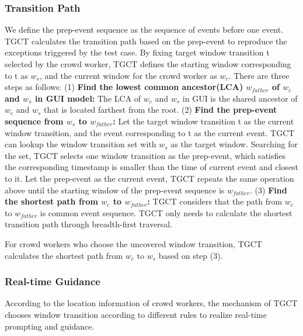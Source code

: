 \subsubsection{Transition Path}
We define the prep-event sequence as the sequence of events before one event. TGCT calculates the transition path based on the prep-event to reproduce the exceptions triggered by the test case. By fixing target window transition t selected by the crowd worker, TGCT defines the starting window corresponding to t as $w_{s}$, and the current window for the crowd worker as $w_{c}$.
There are three steps as follows:
(1) \textbf{Find the lowest common ancestor(LCA) $w_{father}$ of $w_{c}$ and $w_{s}$ in GUI model:} The LCA of $w_{c}$ and $w_{s}$ in GUI is the shared ancestor of $w_{c}$ and $w_{s}$ that is located farthest from the root.
(2) \textbf{Find the prep-event sequence from $w_{s}$ to $w_{father}$:} Let the target window transition t as the current window transition, and the event corresponding to t as the current event. TGCT can lookup the window transition set with $w_{s}$ as the target window. Searching for the set, TGCT selects one window transition as the prep-event, which satisfies the corresponding timestamp is smaller than the time of current event and closest to it. Let the prep-event as the current event, TGCT repeats the same operation above until the starting window of the prep-event sequence is $w_{father}$.
(3) \textbf{Find the shortest path from $w_{c}$ to $w_{father}$:} TGCT considers that the path from $w_{c}$ to $w_{father}$ is common event sequence. TGCT only needs to calculate the shortest transition path through breadth-first traversal.

For crowd workers who choose the uncovered window transition, TGCT calculates the shortest path from $w_{c}$ to $w_{s}$ based on step (3).

\subsubsection{Real-time Guidance}
According to the location information of crowd workers, the mechanism of TGCT chooses window transition according to different rules to realize real-time prompting and guidance. 
